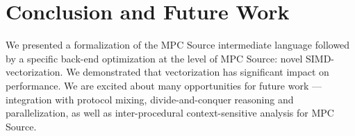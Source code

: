 \documentclass[sigconf, screen, review, anonymous, natbib=false, dvipsnames, table]{acmart}
\theoremstyle{definition}
\begin{document}











%
%

\section{Conclusion and Future Work}
\label{sec:conclusion}

We presented a formalization of the MPC Source intermediate language followed by a specific back-end optimization at the level of MPC Source: novel SIMD-vectorization. We demonstrated that vectorization has significant impact on performance. 
We are excited about many opportunities for future work --- integration with protocol mixing, divide-and-conquer reasoning and parallelization, as well as inter-procedural context-sensitive analysis for  MPC Source. %

%




%
%



\end{document}
